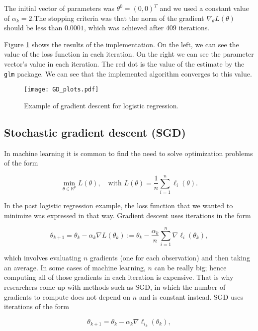 The initial vector of parameters was $\theta^0 = (0, 0)^T$ and we used a constant value of $\alpha_k = 2$.The stopping criteria was that the norm of the gradient $\nabla_{\theta} L(\theta)$ should be less than $0.0001$, which was achieved after 409 iterations.

Figure \ref{fig:GD_plots} shows the results of the implementation. On the left, we can see the value of the loss function in each iteration. On the right we can see the parameter vector's value in each iteration. The red dot is the value of the estimate by the \texttt{glm} package. We can see that the implemented algorithm converges to this value.

\begin{figure}[H]
    \centering
    \texttt{[image: GD\_plots.pdf]}
    \caption{Example of gradient descent for logistic regression.}
    \label{fig:GD_plots}
\end{figure}


\subsection{Stochastic gradient descent (SGD)}

In machine learning it is common to find the need to solve optimization problems of the form

\begin{equation}
  \min_{\theta \in \mathbb{R}^p} L(\theta), \quad \text{with} \, \,
  L(\theta) = \frac{1}{n} \sum_{i = 1}^n { \ell_i(\theta) }.
\end{equation}

In the past logistic regression example, the loss function that we wanted to minimize was expressed in that way. Gradient descent uses iterations in the form

\[
  \theta_{k+1} = \theta_k - \alpha_k \nabla L(\theta_k) :=\theta_k - \frac{\alpha_k}{n} \sum_{i = 1}^n \nabla \ell_i(\theta_k),
\]

which involves evaluating $n$ gradients (one for each observation) and then taking an average. In some cases of machine learning, $n$ can be really big; hence computing all of those gradients in each iteration is expensive. That is why researchers come up with methods such as SGD, in which the number of gradients to compute does not depend on $n$ and is constant instead. SGD uses iterations of the form

\[
  \theta_{k+1} = \theta_k - \alpha_k \nabla \ell_{i_k}(\theta_k),
\]

